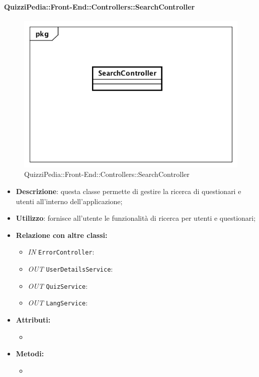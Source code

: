 \paragraph{QuizziPedia::Front-End::Controllers::SearchController}
\begin{figure}
	\centering
	\includegraphics[scale=0.45]{UML/Classi/Front-End/QuizziPedia_Front-end_Controller_SearchController.png}
	\caption{QuizziPedia::Front-End::Controllers::SearchController}
\end{figure}
\begin{itemize}
	\item \textbf{Descrizione}: questa classe permette di gestire la ricerca di questionari e utenti all'interno dell'applicazione;
	\item \textbf{Utilizzo}: fornisce all'utente le funzionalità di ricerca per utenti e questionari;
	\item \textbf{Relazione con altre classi:}
	\begin{itemize}
		\item \textit{IN} \texttt{ErrorController}: 
		\item \textit{OUT} \texttt{UserDetailsService}: 
		\item \textit{OUT} \texttt{QuizService}: 
		\item \textit{OUT} \texttt{LangService}: 
	\end{itemize}
	\item \textbf{Attributi:}
	\begin{itemize}
		\item 
	\end{itemize}
	\item \textbf{Metodi:}
	\begin{itemize}
		\item 
	\end{itemize}
\end{itemize}

